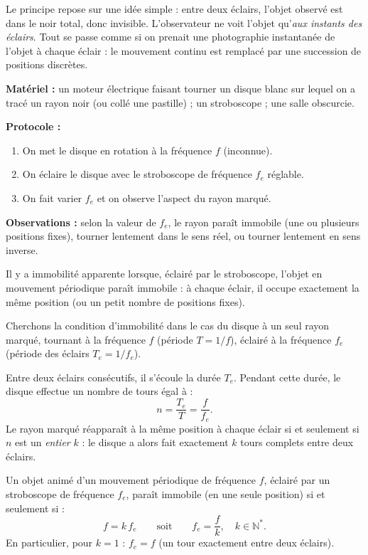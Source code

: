 \documentclass[11pt]{article}
\newcommand{\cle}[1]{{\popxbold\color{popdark}#1}}
\newcounter{popsec}
\newcounter{popsub}
\newcommand{\courssub}[1]{%
  \stepcounter{popsub}%
  \par\vspace{9pt}\noindent{\popxbold\fontsize{11.5}{13}\selectfont\color{popink}{\color{poporange}\thepopsec.\thepopsub}\hspace{6pt}#1}\par\nopagebreak\vspace{4pt}
}
\begin{document}
Le principe repose sur une idée simple : entre deux éclairs, l'objet observé est dans le noir total, donc invisible. L'observateur ne voit l'objet qu'\emph{aux instants des éclairs}. Tout se passe comme si on prenait une photographie instantanée de l'objet à chaque éclair : le mouvement continu est remplacé par une succession de positions discrètes.

\begin{experience}
\textbf{Matériel :} un moteur électrique faisant tourner un disque blanc sur lequel on a tracé un rayon noir (ou collé une pastille) ; un stroboscope ; une salle obscurcie.

\textbf{Protocole :}
\begin{enumerate}
\item On met le disque en rotation à la fréquence $f$ (inconnue).
\item On éclaire le disque avec le stroboscope de fréquence $f_e$ réglable.
\item On fait varier $f_e$ et on observe l'aspect du rayon marqué.
\end{enumerate}

\textbf{Observations :} selon la valeur de $f_e$, le rayon paraît immobile (une ou plusieurs positions fixes), tourner lentement dans le sens réel, ou tourner lentement en sens inverse.
\end{experience}

\courssub{Immobilité apparente}

\begin{definition}
Il y a \cle{immobilité apparente} lorsque, éclairé par le stroboscope, l'objet en mouvement périodique paraît immobile : à chaque éclair, il occupe exactement la même position (ou un petit nombre de positions fixes).
\end{definition}

Cherchons la condition d'immobilité dans le cas du disque à un seul rayon marqué, tournant à la fréquence $f$ (période $T = 1/f$), éclairé à la fréquence $f_e$ (période des éclairs $T_e = 1/f_e$).

Entre deux éclairs consécutifs, il s'écoule la durée $T_e$. Pendant cette durée, le disque effectue un nombre de tours égal à :
\[ n = \frac{T_e}{T} = \frac{f}{f_e}. \]
Le rayon marqué réapparaît à la même position à chaque éclair si et seulement si $n$ est un \emph{entier} $k$ : le disque a alors fait exactement $k$ tours complets entre deux éclairs.

\begin{propriete}
Un objet animé d'un mouvement périodique de fréquence $f$, éclairé par un stroboscope de fréquence $f_e$, paraît immobile (en une seule position) si et seulement si :
\[ f = k\, f_e \qquad \text{soit} \qquad f_e = \frac{f}{k}, \quad k \in \mathbb{N}^{*}. \]
En particulier, pour $k = 1$ : $f_e = f$ (un tour exactement entre deux éclairs).
\end{propriete}
\end{document}
